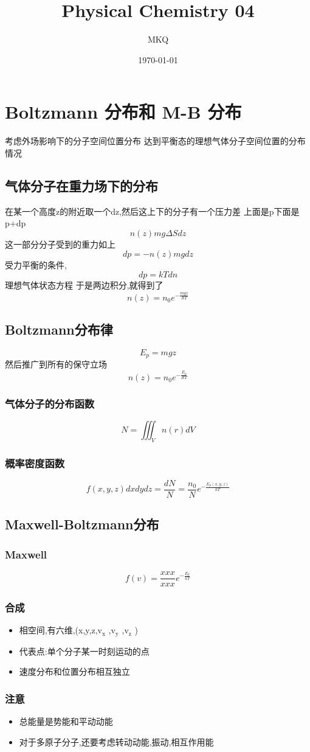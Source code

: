 \documentclass[11pt]{article}
\author{MKQ}
\date{\today}
\title{Physical Chemistry 04}
\begin{document}
\maketitle
\tableofcontents

\section{Boltzmann 分布和 M-B 分布}
\label{sec:org18c2bc0}
考虑外场影响下的分子空间位置分布
达到平衡态的理想气体分子空间位置的分布情况
\subsection{气体分子在重力场下的分布}
\label{sec:org33468be}
在某一个高度z的附近取一个dz,然后这上下的分子有一个压力差
上面是p下面是p+dp
\[
n(z)mg\Delta S dz
\]
这一部分分子受到的重力如上
\[
dp=-n(z)mgdz
\]
受力平衡的条件,
\[
dp=kTdn
\]
理想气体状态方程
于是两边积分,就得到了
\[
n(z)=n_0 e^{-\frac{mgz}{RT}}
\]
\subsection{Boltzmann分布律}
\label{sec:orgfdac880}
\[
E_p =mgz
\]
然后推广到所有的保守立场
\[
n(z)=n_0 e^{-\frac{E_p}{RT}}
\]
\subsubsection{气体分子的分布函数}
\label{sec:org2e00f86}
\[
N=\iiint_V n(r) dV 
\]
\subsubsection{概率密度函数}
\label{sec:orgb797a56}
\[
f(x,y,z)dxdydz=\frac{dN}{N}=\frac{n_0}{N}e^{-\frac{E_p (x,y,z)}{kT}}
\]
\subsection{Maxwell-Boltzmann分布}
\label{sec:org49a1510}
\subsubsection{Maxwell}
\label{sec:orgacc2218}
\[
f(v)=\frac{xxx}{xxx} e^{-\frac{E_k}{kT}}
\]
\subsubsection{合成}
\label{sec:org091f917}
\begin{itemize}
\item 相空间,有六维,(x,y,z,v\(_{\text{x}}\) ,v\(_{\text{y}}\) ,v\(_{\text{z}}\) )
\item 代表点:单个分子某一时刻运动的点
\item 速度分布和位置分布相互独立
\end{itemize}
\subsubsection{注意}
\label{sec:orga21e0b5}
\begin{itemize}
\item 总能量是势能和平动动能
\item 对于多原子分子,还要考虑转动动能,振动,相互作用能
\end{itemize}
\end{document}
